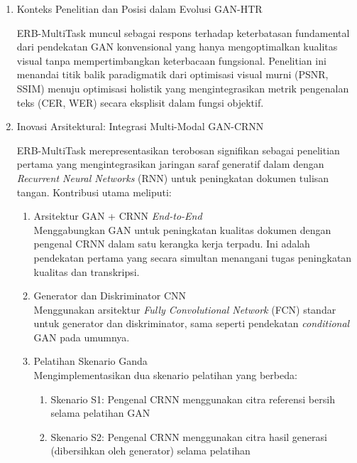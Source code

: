\documentclass[12pt,a4paper]{article}
\begin{document}
\begin{enumerate}[leftmargin=*, labelindent=0pt, itemsep=1ex, topsep=0pt]

\item Konteks Penelitian dan Posisi dalam Evolusi GAN-HTR
\label{para:erb-konteks}

ERB-MultiTask muncul sebagai respons terhadap keterbatasan fundamental dari pendekatan GAN konvensional yang hanya mengoptimalkan kualitas visual tanpa mempertimbangkan keterbacaan fungsional. Penelitian ini menandai titik balik paradigmatik dari optimisasi visual murni (PSNR, SSIM) menuju optimisasi holistik yang mengintegrasikan metrik pengenalan teks (CER, WER) secara eksplisit dalam fungsi objektif.

\item Inovasi Arsitektural: Integrasi Multi-Modal GAN-CRNN
\label{para:erb-inovasi}

ERB-MultiTask merepresentasikan terobosan signifikan sebagai penelitian pertama yang mengintegrasikan jaringan saraf generatif dalam dengan \textit{Recurrent Neural Networks} (RNN) untuk peningkatan dokumen tulisan tangan. Kontribusi utama meliputi:

\begin{enumerate}[leftmargin=1.5em, labelsep=0.5em, itemindent=0pt, noitemsep, topsep=0pt, label=\alph*.]
      \item Arsitektur GAN + CRNN \textit{End-to-End} \mbox{}\\[0.1em]
            Menggabungkan GAN untuk peningkatan kualitas dokumen dengan pengenal CRNN dalam satu kerangka kerja terpadu. Ini adalah pendekatan pertama yang secara simultan menangani tugas peningkatan kualitas dan transkripsi.

      \item Generator dan Diskriminator CNN \mbox{}\\[0.1em]
            Menggunakan arsitektur \textit{Fully Convolutional Network} (FCN) standar untuk generator dan diskriminator, sama seperti pendekatan \textit{conditional} GAN pada umumnya.

      \item Pelatihan Skenario Ganda \mbox{}\\[0.1em]
            Mengimplementasikan dua skenario pelatihan yang berbeda:
            \begin{enumerate}[leftmargin=1.5em, labelsep=0.5em, itemindent=0pt, noitemsep, topsep=0pt, label=\alph*.]
                  \item Skenario S1: Pengenal CRNN menggunakan citra referensi bersih selama pelatihan GAN
                  \item Skenario S2: Pengenal CRNN menggunakan citra hasil generasi (dibersihkan oleh generator) selama pelatihan
            \end{enumerate}


\end{enumerate}
\end{enumerate}
\end{document}
